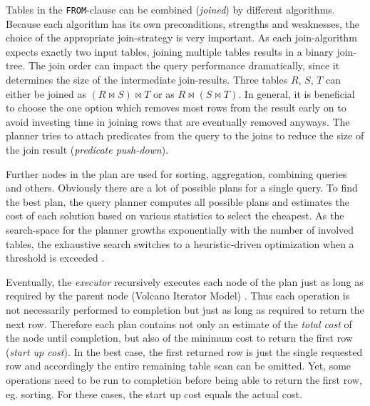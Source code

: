 Tables in the \texttt{FROM}-clause can be combined (\textit{joined}) by different algorithms. Because each algorithm has its own preconditions, strengths and weaknesses,  the choice of the appropriate join-strategy is very important. As each join-algorithm expects exactly two input tables, joining multiple tables results in a binary join-tree. The join order can impact the query performance dramatically, since it determines the size of the intermediate join-results. Three tables $R$, $S$, $T$ can either be joined as $(R \bowtie S) \bowtie T$ or as $R \bowtie (S \bowtie T)$. In general, it is beneficial to choose the one option which removes most rows from the result early on to avoid investing time in joining rows that are eventually removed anyways. The planner tries to attach predicates from the query to the joins to reduce the size of the join result (\textit{predicate push-down}).

Further nodes in the plan are used for sorting, aggregation, combining queries and others. Obviously there are a lot of possible plans for a single query. To find the best plan, the query planner computes all possible plans and estimates the cost of each solution based on various statistics to select the cheapest. As the search-space for the planner growths exponentially with the number of involved tables, the exhaustive search switches to a heuristic-driven optimization when a threshold is exceeded \cite[p. 2064 ff.]{psql}.


Eventually, the \textit{executor} recursively executes each node of the plan just as long as required by the parent node (Volcano Iterator Model) \cite{volcano}. Thus each operation is not necessarily performed to completion but just as long as required to return the next row. Therefore each plan contains not only an estimate of the \textit{total cost} of the node until completion, but also of the minimum cost to return the first row (\textit{start up cost}). In the best case, the first returned row is just the single requested row and accordingly the entire remaining table scan can be omitted. Yet, some operations need to be run to completion before being able to return the first row, eg. sorting. For these cases, the start up cost equals the actual cost.


